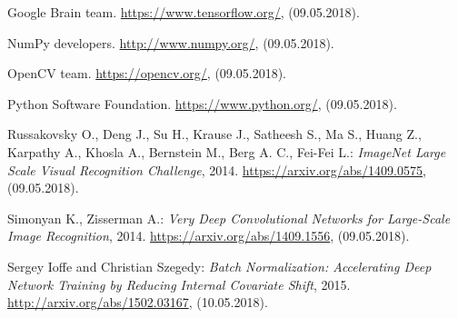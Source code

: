 \documentclass[a4paper]{article}
\begin{document}
\clearpage
\begin{thebibliography}{99}

 Google Brain team. \url{https://www.tensorflow.org/}, (09.05.2018).

 NumPy developers. \url{http://www.numpy.org/}, (09.05.2018).

 OpenCV team. \url{https://opencv.org/}, (09.05.2018).

 Python Software Foundation. \url{https://www.python.org/}, (09.05.2018).

Russakovsky O., Deng J., Su H., Krause J., Satheesh S., Ma S., Huang Z., Karpathy A., Khosla A., Bernstein M., Berg A. C., Fei-Fei L.: \textit{ImageNet Large Scale Visual Recognition Challenge}, 2014. 
\url{https://arxiv.org/abs/1409.0575}, (09.05.2018).

Simonyan K., Zisserman A.: \textit{Very Deep Convolutional Networks for Large-Scale Image Recognition}, 2014. \url{https://arxiv.org/abs/1409.1556}, (09.05.2018).

 Sergey Ioffe and Christian Szegedy: \textit{Batch Normalization: Accelerating Deep Network Training by Reducing Internal Covariate Shift}, 2015. \url{http://arxiv.org/abs/1502.03167}, (10.05.2018).

\end{thebibliography}
\end{document}
